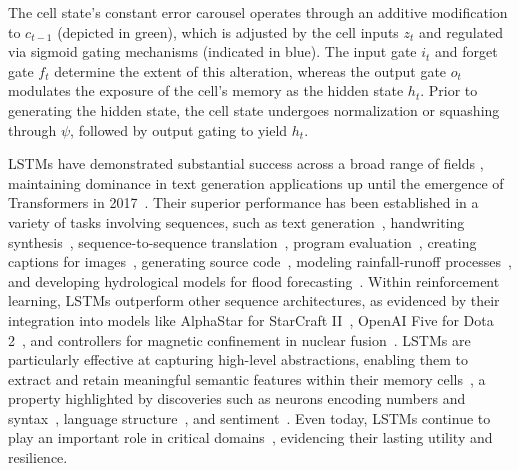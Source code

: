 The cell state's constant error carousel operates through an additive modification to $c_{t-1}$ (depicted in green), which is adjusted by the cell inputs $z_t$ and regulated via sigmoid gating mechanisms (indicated in blue). The input gate $i_t$ and forget gate $f_t$ determine the extent of this alteration, whereas the output gate $o_t$ modulates the exposure of the cell's memory as the hidden state $h_t$. Prior to generating the hidden state, the cell state undergoes normalization or squashing through $\psi$, followed by output gating to yield $h_t$.

LSTMs have demonstrated substantial success across a broad range of fields \citep{Hochreiter:01,Hochreiter:07,Schmidhuber:15}, maintaining dominance in text generation applications up until the emergence of Transformers in 2017~\citep{Vaswani:17}. Their superior performance has been established in a variety of tasks involving sequences, such as text generation~\citep{Graves:13,Karpathy:15blog}, handwriting synthesis~\citep{Graves:13}, sequence-to-sequence translation~\citep{Sutskever:14nips}, program evaluation~\citep{Zaremba:14arxiv}, creating captions for images~\citep{Karpathy:15,Hossain:19}, generating source code~\citep{Karpathy:15blog}, modeling rainfall-runoff processes~\citep{Kratzert:18,Kratzert:19}, and developing hydrological models for flood forecasting~\citep{Nearing:24}. Within reinforcement learning, LSTMs outperform other sequence architectures, as evidenced by their integration into models like AlphaStar for StarCraft II~\citep{Vinyals:17short}, OpenAI Five for Dota 2~\citep{OpenAI:19}, and controllers for magnetic confinement in nuclear fusion~\citep{Degrave:22short}. LSTMs are particularly effective at capturing high-level abstractions, enabling them to extract and retain meaningful semantic features within their memory cells~\citep{Karpathy:15blog}, a property highlighted by discoveries such as neurons encoding numbers and syntax~\citep{Lakretz:19}, language structure~\citep{Bau:19}, and sentiment~\citep{Radford:17arxiv}. Even today, LSTMs continue to play an important role in critical domains~\citep{Degrave:22short,Nearing:24}, evidencing their lasting utility and resilience.

